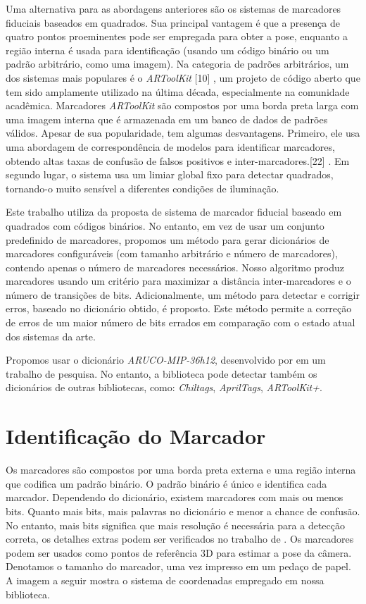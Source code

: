 Uma alternativa para as abordagens anteriores são os sistemas de marcadores fiduciais baseados em quadrados. Sua principal vantagem é que a presença de quatro pontos proeminentes pode ser empregada para obter a pose, enquanto a região interna é usada para identificação (usando um código binário ou um padrão arbitrário, como uma imagem). Na categoria de padrões arbitrários, um dos sistemas mais populares é o \textit{ARToolKit} [10] , um projeto de código aberto que tem sido amplamente utilizado na última década, especialmente na comunidade acadêmica. Marcadores \textit{ARToolKit} são compostos por uma borda preta larga com uma imagem interna que é armazenada em um banco de dados de padrões válidos. Apesar de sua popularidade, tem algumas desvantagens. Primeiro, ele usa uma abordagem de correspondência de modelos para identificar marcadores, obtendo altas taxas de confusão de falsos positivos e inter-marcadores.[22] . Em segundo lugar, o sistema usa um limiar global fixo para detectar quadrados, tornando-o muito sensível a diferentes condições de iluminação.


Este trabalho utiliza da proposta de sistema de marcador fiducial baseado em quadrados com códigos binários. No entanto, em vez de usar um conjunto predefinido de marcadores, propomos um método para gerar dicionários de marcadores configuráveis ​​(com tamanho arbitrário e número de marcadores), contendo apenas o número de marcadores necessários. Nosso algoritmo produz marcadores usando um critério para maximizar a distância inter-marcadores e o número de transições de bits. Adicionalmente, um método para detectar e corrigir erros, baseado no dicionário obtido, é proposto. Este método permite a correção de erros de um maior número de bits errados em comparação com o estado atual dos sistemas da arte.


Propomos usar o dicionário \textit{ARUCO-MIP-36h12}, desenvolvido por \cite{Garrido2016} em um trabalho de pesquisa. No entanto, a biblioteca pode detectar também os dicionários de outras bibliotecas, como: \textit{Chiltags}, \textit{AprilTags}, \textit{ARToolKit+}.

\section{Identificação do Marcador}

Os marcadores são compostos por uma borda preta externa e uma região interna que codifica um padrão binário. O padrão binário é único e identifica cada marcador. Dependendo do dicionário, existem marcadores com mais ou menos bits. Quanto mais bits, mais palavras no dicionário e menor a chance de confusão. No entanto, mais bits significa que mais resolução é necessária para a detecção correta, os detalhes extras podem ser verificados no trabalho de \citet{Garrido2016}. Os marcadores podem ser usados como pontos de referência 3D para estimar a pose da câmera. Denotamos o tamanho do marcador, uma vez impresso em um pedaço de papel. A imagem a seguir mostra o sistema de coordenadas empregado em nossa biblioteca.

